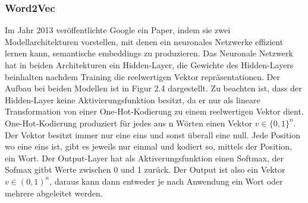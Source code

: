 \documentclass[12pt,letterpaper,ngerman]{article}
\begin{document}
\subsubsection{Word2Vec}
Im Jahr 2013 veröffentlichte Google ein Paper,
indem sie zwei Modellarchitekturen vorstellen,
mit denen ein neuronales Netzwerke effizient
lernen kann, semantische embeddings zu produzieren.
Das Neuronale Netzwerk hat in beiden Architekturen
ein Hidden-Layer, die Gewichte des Hidden-Layers beinhalten nachdem
Training die reelwertigen Vektor repräsentationen.
Der Aufbau bei beiden Modellen ist in Figur 2.4 dargestellt.
Zu beachten ist, dass der Hidden-Layer keine Aktivierungsfunktion
besitzt, da er nur als lineare Transformation von einer
One-Hot-Kodierung zu einem reelwertigen Vektor dient.
One-Hot-Kodierung produziert für jedes aus
n Wörten einen Vektor $v \in \{0,1\}^n$. Der Vektor besitzt immer
nur eine eins und sonst überall eine null. Jede Position wo eine eins
ist, gibt es jeweils nur einmal und kodiert so, mittels der Position,
ein Wort. Der Output-Layer hat als Aktiverungsfunktion einen Softmax,
der Sofmax gitbt Werte zwischen 0 und 1 zurück. Der Output ist also ein
Vektor $v \in (0,1)^n$, daraus kann dann entweder je nach Anwendung ein
Wort oder mehrere abgeleitet werden.
\end{document}
